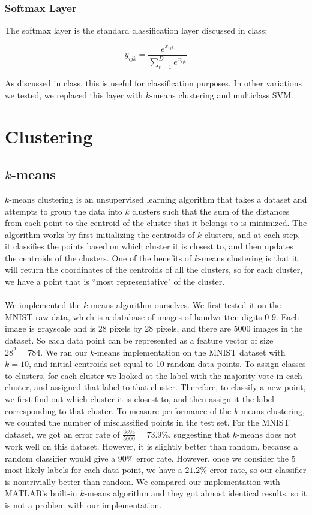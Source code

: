 \documentclass[11pt]{article}
\begin{document}
\subsubsection{Softmax Layer}
The softmax layer is the standard classification layer discussed in class:

\[ y_{ijk} = \dfrac{e^{x_{ijk}}}{\sum_{t=1}^D e^{x_{ijk}}} \]

As discussed in class, this is useful for classification purposes. In other variations we tested, we replaced this layer with $k$-means clustering and multiclass SVM.


\section{Clustering}
\subsection{$k$-means}
$k$-means clustering is an unsupervised learning algorithm that takes a dataset and attempts to group the data into $k$ clusters such that the sum of the distances from each point to the centroid of the cluster that it belongs to is minimized. The algorithm works by first initializing the centroids of $k$ clusters, and at each step, it classifies the points based on which cluster it is closest to, and then updates the centroids of the clusters. One of the benefits of $k$-means clustering is that it will return the coordinates of the centroids of all the clusters, so for each cluster, we have a point that is ``most representative" of the cluster.\\~\\
We implemented the $k$-means algorithm ourselves. We first tested it on the MNIST raw data, which is a database of images of handwritten digits 0-9. Each image is grayscale and is 28 pixels by 28 pixels, and there are 5000 images in the dataset. So each data point can be represented as a feature vector of size $28^2 = 784$. We ran our $k$-means implementation on the MNIST dataset with $k=10$, and initial centroids set equal to 10 random data points. To assign classes to clusters, for each cluster we looked at the label with the majority vote in each cluster, and assigned that label to that cluster. Therefore, to classify a new point, we first find out which cluster it is closest to, and then assign it the label corresponding to that cluster. To measure performance of the $k$-means clustering, we counted the number of misclassified points in the test set. For the MNIST dataset, we got an error rate of $\frac{3695}{5000} = 73.9\%$, suggesting that $k$-means does not work well on this dataset. However, it is slightly better than random, because a random classifier would give a $90\%$ error rate. However, once we consider the 5 most likely labels for each data point, we have a $21.2\%$ error rate, so our classifier is nontrivially better than random. We compared our implementation with MATLAB's built-in $k$-means algorithm and they got almost identical results, so it is not a problem with our implementation. \\~\\
\end{document}
